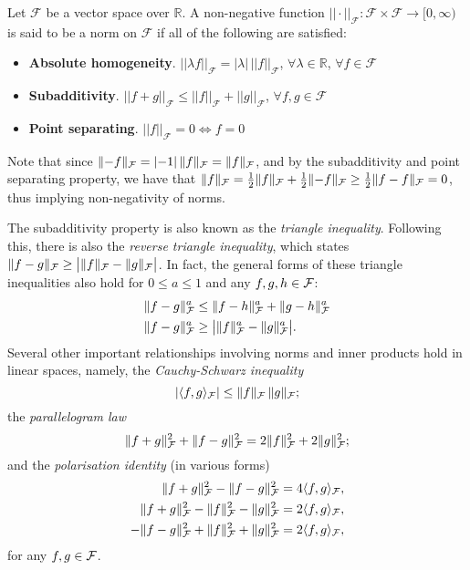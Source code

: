 \begin{definition}[Norms]
	Let $\mathcal F$ be a vector space over $\mathbb R$. A non-negative function $||\cdot||_{\mathcal F}:\mathcal F \times \mathcal F \rightarrow \mathbb [0,\infty)$ is said to be a norm  on $\mathcal F$ if all of the following are satisfied:
	\begin{itemize}
	\item \textbf{Absolute homogeneity}. $||\lambda f||_{\mathcal F} = |\lambda| \, ||f||_{\mathcal F}$, $\forall \lambda \in \mathbb R$, $\forall f \in \mathcal F$
	\item \textbf{Subadditivity}. $||f+g||_{\mathcal F} \leq ||f||_{\mathcal F} + ||g||_{\mathcal F}$, $\forall f,g \in \mathcal F$
	\item \textbf{Point separating}. $||f||_{\mathcal F} = 0 \Leftrightarrow f=0$
	\end{itemize}
	Note that since $\lVert-f\rVert_{\mathcal F} = \lvert-1\rvert \, \lVert f\rVert_{\mathcal F} = \lVert f\rVert_{\mathcal F}$, and by the subadditivity and point separating property, we have that $\lVert f\rVert_{\mathcal F} = \frac{1}{2}\lVert f\rVert_{\mathcal F} + \frac{1}{2}\lVert-f\rVert_{\mathcal F} \geq \frac{1}{2}\lVert f - f\rVert_{\mathcal F} = 0$, thus implying non-negativity of norms.
\end{definition}


The subadditivity property is also known as the \emph{triangle inequality}.
Following this, there is also the \emph{reverse triangle inequality}, which states $\lVert f-g\rVert_{\mathcal F} \geq \big\vert \lVert f\rVert_{\mathcal F} - \lVert g\rVert_{\mathcal F} \big\vert$.
In fact, the general forms of these triangle inequalities \citep[Lemma 10]{bergsma2017} also hold for $0\leq a\leq 1$ and any $f,g,h\in{\mathcal F}$:
\newcommand{\normF}[1]{\norm{#1}_\cF}
\begingroup
\setlength{\abovedisplayskip}{9pt}
\setlength{\belowdisplayskip}{7pt}
\begin{align}
  \normF{f-g}^a &\leq \normF{f-h}^a + \normF{g-h}^a \label{eq:trieq1} \\ 
  \normF{f-g}^a &\geq \big\vert \normF{f}^a - \normF{g}^a \big\vert. \label{eq:trieq2}
\end{align}
\endgroup
Several other important relationships involving norms and inner products hold in linear spaces, namely, the \emph{Cauchy-Schwarz inequality}
\begingroup
\setlength{\abovedisplayskip}{9pt}
\setlength{\belowdisplayskip}{7pt}
\[
  |\langle f,g\rangle_{\mathcal F}| \leq \lVert f\rVert_{\mathcal F} \, \lVert g\rVert_{\mathcal F};
\]
\endgroup
the \emph{parallelogram law}
\begingroup
\setlength{\abovedisplayskip}{7pt}
\setlength{\belowdisplayskip}{7pt}
\[
  \lVert f+g\rVert_{\mathcal F}^2 + \lVert f-g\rVert_{\mathcal F}^2 = 2\lVert f\rVert_{\mathcal F}^2 + 2\lVert g\rVert_{\mathcal F}^2;
\]
\endgroup
and the \emph{polarisation identity} (in various forms)
\begingroup
\setlength{\abovedisplayskip}{9pt}
\setlength{\belowdisplayskip}{7pt}
\begin{align*}
  \lVert f+g\rVert_{\mathcal F}^2 - \lVert f-g\rVert_{\mathcal F}^2 &= 4\langle f,g\rangle_{\mathcal F},  \\
  \lVert f+g\rVert_{\mathcal F}^2 - \lVert f\rVert_{\mathcal F}^2 - \lVert g\rVert_{\mathcal F}^2 &= 2\langle f,g\rangle_{\mathcal F}, \\
  - \lVert f-g\rVert_{\mathcal F}^2 + \lVert f\rVert_{\mathcal F}^2 + \lVert g\rVert_{\mathcal F}^2  &= 2\langle f,g\rangle_{\mathcal F},
\end{align*}
\endgroup
for any $f,g\in{\mathcal F}$.

